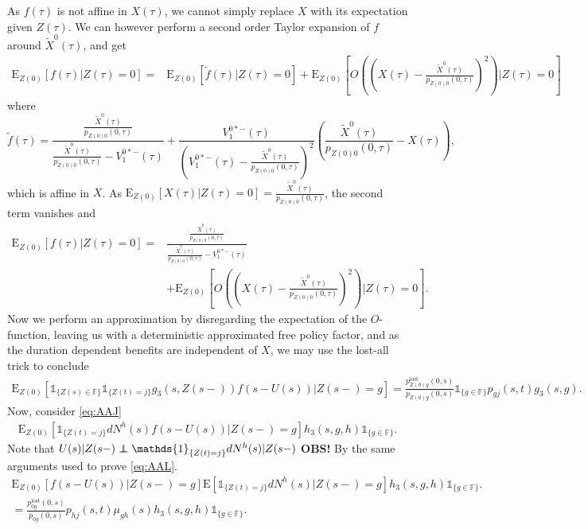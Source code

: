 \documentclass[12pt]{article}
\newcommand{\E}{\text{E}}
\newcommand{\indic}[1]{\mathds{1}_{ \{ #1 \} }}
\newcommand\independent{\protect\mathpalette{\protect\independenT}{\perp}}
\def\independenT#1#2{\mathrel{\rlap{$#1#2$}\mkern2mu{#1#2}}}
\theoremstyle{my_thm}
\begin{document}
As $f(\tau)$ is not affine in $X(\tau)$, we cannot simply replace $X$ with its expectation given $Z(\tau)$. We can however perform a second order Taylor expansion of $f$ around $\tilde{X}^0(\tau)$, and get
\begin{align*}
\E_{Z(0)}[f(\tau) |Z(\tau)=0]
=&
\E_{Z(0)}[\tilde{f}(\tau) |Z(\tau)=0]+ 
\E_{Z(0)} \left[ O \left( \left( X(\tau)-\frac{\tilde{X}^0(\tau)}{p_{Z(0)0}(0,\tau)} \right) ^2 \right) \bigg| Z(\tau)=0 \right]
\end{align*}
where 
$$
\tilde{f}(\tau)=
\frac{
	\frac{\tilde{X}^0(\tau)}{p_{Z(0)0}(0,\tau)}
}{
	\frac{\tilde{X}^0(\tau)}{p_{Z(0)0}(0,\tau)}
	-V_1^{0*-}(\tau)
}
+
\frac{
	V_1^{0*-}(\tau)
	}{
	\left( V_1^{0*-}(\tau)-
	\frac{\tilde{X}^0(\tau)}{p_{Z(0)0}(0,\tau)}
	\right)^2
}
\left( \frac{\tilde{X}^0(\tau)}{p_{Z(0)0}(0,\tau)}-X(\tau)\right),
$$
which is affine in $X$. As $\E_{Z(0)}[X(\tau)|Z(\tau)=0]=\frac{\tilde{X}^0(\tau)}{p_{Z(0)0}(0,\tau)}$, the second term vanishes and
\begin{align*}
\E_{Z(0)}[f(\tau) |Z(\tau)=0]
=&
\frac{
	\frac{\tilde{X}^0(\tau)}{p_{Z(0)0}(0,\tau)}
}{
	\frac{\tilde{X}^0(\tau)}{p_{Z(0)0}(0,\tau)}
	-V_1^{0*-}(\tau)
}
\\
&+
\E_{Z(0)} \left[ O \left( \left( X(\tau)-\frac{\tilde{X}^0(\tau)}{p_{Z(0)0}(0,\tau)} \right) ^2 \right) \bigg| Z(\tau)=0 \right].
\end{align*}
Now we perform an approximation by disregarding the expectation of the $O$-function, leaving us with a deterministic approximated free policy factor, and as the duration dependent benefits are independent of $X$, we may use the lost-all trick to conclude
\begin{align*}
\E_{Z(0)} [ \indic{Z(s) \in \mathbb{F}} \indic{Z(t)=j} g_3(s,Z(s-)) f(s-U(s))|Z(s-)=g]
=
\frac{p^{\text{lost}}_{Z(0)g}(0,s)}{p_{Z(0)g}(0,s)} \indic{g \in \mathbb{F}} p_{gj}(s,t)g_3(s,g).
\end{align*}
Now, consider \eqref{eq:AAJ}
\begin{align*}
\E_{Z(0)} [  \indic{Z(t)=j}  dN^h(s) f(s-U(s))|Z(s-)=g] h_3(s,g,h) \indic{g \in \mathbb{F}}.
\end{align*}
Note that $U(s)|Z(s-) \independent \indic{Z(t)=j}dN^h(s)|Z(s-)$ \textbf{OBS!} By the same arguments used to prove \eqref{eq:AAL}.
\begin{align*}
\E_{Z(0)}[f(s-U(s))|Z(s-)=g] \E[ \indic{Z(t)=j}dN^h(s) |Z(s-)=g] h_3(s,g,h) \indic{g \in \mathbb{F}}.
\\
=\frac{p_{0g}^\text{lost}(0,s)}{p_{0g}(0,s)} p_{hj}(s,t) \mu_{gh}(s) h_3(s,g,h) \indic{g \in \mathbb{F}}.
\end{align*}
\end{document}
